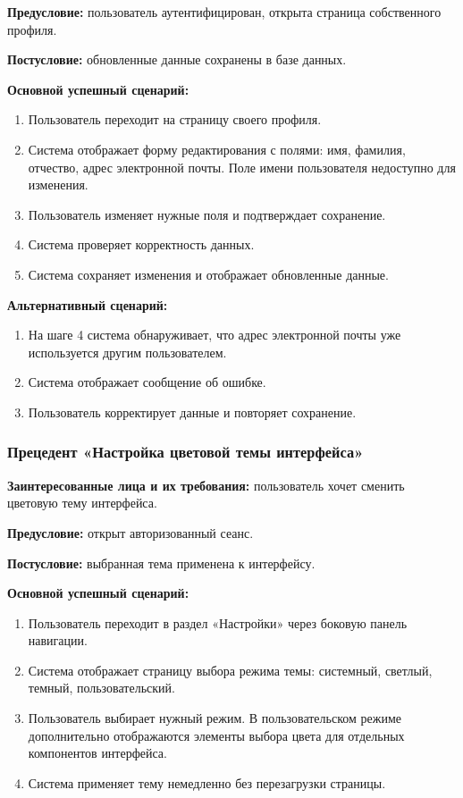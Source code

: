 \textbf{Предусловие:} пользователь аутентифицирован, открыта страница собственного профиля.

\textbf{Постусловие:} обновленные данные сохранены в базе данных.

\textbf{Основной успешный сценарий:}
\begin{enumerate}
    \item Пользователь переходит на страницу своего профиля.
    \item Система отображает форму редактирования с полями: имя, фамилия, отчество, адрес электронной почты. Поле имени пользователя недоступно для изменения.
    \item Пользователь изменяет нужные поля и подтверждает сохранение.
    \item Система проверяет корректность данных.
    \item Система сохраняет изменения и отображает обновленные данные.
\end{enumerate}

\textbf{Альтернативный сценарий:}
\begin{enumerate}
    \item На шаге 4 система обнаруживает, что адрес электронной почты уже используется другим пользователем.
    \item Система отображает сообщение об ошибке.
    \item Пользователь корректирует данные и повторяет сохранение.
\end{enumerate}

\subsubsection{Прецедент «Настройка цветовой темы интерфейса»}

\textbf{Заинтересованные лица и их требования:} пользователь хочет сменить цветовую тему интерфейса.

\textbf{Предусловие:} открыт авторизованный сеанс.

\textbf{Постусловие:} выбранная тема применена к интерфейсу.

\textbf{Основной успешный сценарий:}
\begin{enumerate}
    \item Пользователь переходит в раздел «Настройки» через боковую панель навигации.
    \item Система отображает страницу выбора режима темы: системный, светлый, темный, пользовательский.
    \item Пользователь выбирает нужный режим. В пользовательском режиме дополнительно отображаются элементы выбора цвета для отдельных компонентов интерфейса.
    \item Система применяет тему немедленно без перезагрузки страницы.
\end{enumerate}

